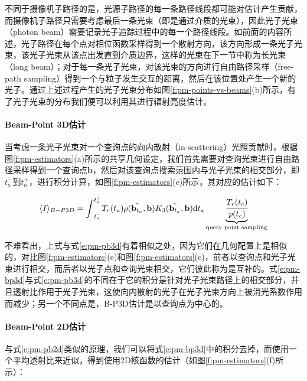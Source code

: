 不同于摄像机子路径的是，光源子路径的每一条路径线段都可能对估计产生贡献，而摄像机子路径只需要考虑最后一条光束（即是通过介质的光束），因此光子光束（photon beam）需要记录光子追踪过程中的每一个路径线段。如前面的内容所述，光子路径在每个点对相位函数采样得到一个散射方向，该方向形成一条光子光束，该光子光束从该点出发直到介质边界，这样的光束在下一节中称为长光束（long beam）；对于每一条光子光束，对该光束的方向进行自由路径采样（free-path sampling）得到一个与粒子发生交互的距离，然后在该位置处产生一个新的光子。通过上述过程产生的光子光束分布如图\ref{f:pm-points-vs-beams}(b)所示，有了光子光束的分布我们便可以利用其进行辐射亮度估计。




\paragraph{Beam-Point 3D估计}
当考虑一条光子光束对一个查询点的向内散射（in-scattering）光照贡献时，根据图\ref{f:pm-estimators}(a)所示的共享几何设定，我们首先需要对查询光束进行自由路径采样得到一个查询点$\mathbf{b}$，然后对该查询点搜索范围内与光子光束的相交部分，即$t^{-}_a$到$t^{+}_a$，进行积分计算，如图\ref{f:pm-estimators}(e)所示，其对应的估计如下：

\begin{equation}\label{e:pm-bp3d}
	\langle I\rangle_{B-P3D}={\rm \int}^{t^{+}_{a}}_{t^{-}_{a}}T_r(t_a) \rho(\tilde{\mathbf{b}_{t_a}},\mathbf{b})K_3(\tilde{\mathbf{b}_{t_a}},\mathbf{b}){\rm d}t_a \underbrace{ \cfrac{T_r(t_c)}{p(t_c)}}_{\text{query point sampling}}
\end{equation}

不难看出，上式与式\ref{e:pm-pb3d}有着相似之处，因为它们在几何配置上是相似的，对比图\ref{f:pm-estimators}(e)和图\ref{f:pm-estimators}(c)，前者以查询点和光子光束进行相交，而后者以光子点和查询光束相交，它们彼此称为是互补的。式\ref{e:pm-bp3d}与式\ref{e:pm-pb3d}的不同在于它的积分是针对光子光束路径上的相交部分，并且透射比作用于光子光束，这使向内散射的光子在光子光束方向上被消光系数作用而减少；另一个不同点是，B-P3D估计是以查询点为中心的。




\paragraph{Beam-Point 2D估计}
与式\ref{e:pm-pb2d}类似的原理，我们可以将式\ref{e:pm-bp3d}中的积分去掉，而使用一个平均透射比来近似，得到使用2D核函数的估计（如图\ref{f:pm-estimators}(f)所示）：

